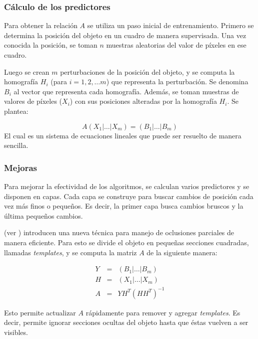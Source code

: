 \subsubsection{Cálculo de los predictores}
Para obtener la relación $A$ se utiliza un paso inicial de entrenamiento.
Primero se determina la posición del objeto en un cuadro de manera supervisada.
Una vez conocida la posición, se toman $n$ muestras aleatorias del valor de
píxeles en ese cuadro.

Luego se crean $m$ perturbaciones de la posición del objeto, y se computa la
homografía $H_i$ (para $i = 1, 2, \dots m$) que representa la perturbación.
Se denomina $B_i$ al vector que representa cada homografía. Además, se toman
muestras de valores de píxeles ($X_i$) con sus posiciones alteradas por la
homografía $H_i$. Se plantea:

\begin{equation}
    A \left( X_1 \lvert \dots \lvert X_m \right) = \left( B_1 \lvert \dots \lvert B_m \right)
\end{equation}
El cual es un sistema de ecuaciones lineales que puede ser resuelto de manera sencilla.

\subsubsection{Mejoras}

Para mejorar la efectividad de los algoritmos, se calculan varios predictores y se disponen en capas.
Cada capa se construye para buscar cambios de posición cada vez más finos o pequeños.
Es decir, la primer capa busca cambios bruscos y la última pequeños cambios.

\citeauthor*{alp} (ver \cite{alp}) introducen una nueva técnica para manejo de oclusiones
parciales de manera eficiente. Para esto se divide el objeto en pequeñas
secciones cuadradas, llamadas \textit{templates}, y se computa la matriz $A$ de
la siguiente manera:

\begin{eqnarray*}
    Y &=& \left( B_1 \lvert \dots \lvert B_m \right) \\
    H &=& \left( X_1 \lvert \dots \lvert X_m \right) \\
    A &=& Y H^T(HH^T)^{-1}
\end{eqnarray*}

Esto permite actualizar $A$
rápidamente para remover y agregar \textit{templates}. Es decir, permite ignorar
secciones ocultas del objeto hasta que éstas vuelven a ser visibles.


